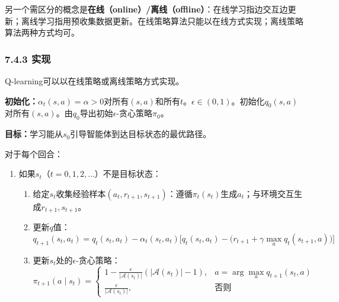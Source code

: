 \documentclass[UTF8]{article}
\begin{document}
另一个需区分的概念是\textbf{在线（online）/离线（offline）}：在线学习指边交互边更新；离线学习指用预收集数据更新。在线策略算法只能以在线方式实现；离线策略算法两种方式均可。

\subsubsection*{7.4.3 实现}

Q-learning可以以在线策略或离线策略方式实现。

\begin{tcolorbox}[
    colback=gray!5!white,
    colframe=gray!50!black,
    title=\textbf{算法7.2：通过Q-learning学习最优策略（在线策略版本）},
    fonttitle=\bfseries,
    arc=2pt, boxrule=0.8pt,
    left=3mm, right=3mm, top=2mm, bottom=2mm
]
\label{alg:qlearning_on}
\textbf{初始化：}$\alpha_t(s, a) = \alpha > 0$对所有$(s, a)$和所有$t$。$\epsilon \in (0, 1)$。初始化$q_0(s, a)$对所有$(s, a)$。由$q_0$导出初始$\epsilon$-贪心策略$\pi_0$。

\textbf{目标：}学习能从$s_0$引导智能体到达目标状态的最优路径。

对于每个回合：
\begin{enumerate}
    \item 如果$s_t$（$t = 0, 1, 2, \dots$）不是目标状态：
    \begin{enumerate}
        \item 给定$s_t$收集经验样本$(a_t, r_{t+1}, s_{t+1})$：遵循$\pi_t(s_t)$生成$a_t$；与环境交互生成$r_{t+1}, s_{t+1}$。
        \item 更新$q$值：
        \[
        q_{t+1}(s_t, a_t) = q_t(s_t, a_t) - \alpha_t(s_t, a_t)\Big[q_t(s_t, a_t) - \big(r_{t+1} + \gamma \max_a q_t(s_{t+1}, a)\big)\Big]
        \]
        \item 更新$s_t$处的$\epsilon$-贪心策略：
        \[
        \pi_{t+1}(a \mid s_t) =
        \begin{cases}
        1 - \frac{\epsilon}{|\mathcal{A}(s_t)|}(|\mathcal{A}(s_t)| - 1), & a = \arg\max_a q_{t+1}(s_t, a) \\[4pt]
        \frac{\epsilon}{|\mathcal{A}(s_t)|}, & \text{否则}
        \end{cases}
        \]
    \end{enumerate}
\end{enumerate}
\end{tcolorbox}
\end{document}
